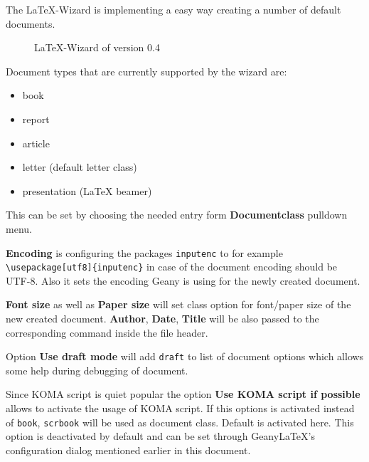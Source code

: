 \documentclass[%
a4paper,%
10pt,%
oneside,%
DIV18,
headsepline,
plainheadsepline,
footsepline,
plainfootsepline,
bibtotoc,%
liststotoc,%
BCOR12mm,%
halfparskip,%
openany,%
]{scrartcl}
\begin{document}
The \LaTeX-Wizard is implementing a easy way creating a number of
default documents.
\begin{figure}[h!]
	\caption{\LaTeX-Wizard of version 0.4}
\end{figure}

Document types that are currently supported by the wizard are:
\begin{itemize}
	\item book
	\item report
	\item article
	\item letter (default letter class)
	\item presentation (\LaTeX{} beamer)
\end{itemize}

This can be set by choosing the needed entry form
\textbf{Documentclass} pulldown menu.

\textbf{Encoding} is configuring the packages \texttt{inputenc} to
for example \texttt{\textbackslash usepackage[utf8]\{inputenc\}} in
case of the document encoding should be UTF-8. Also it sets the
encoding Geany is using for the newly created document.

\textbf{Font size} as well as \textbf{Paper size} will set class option
for font/paper size of the new created document. \textbf{Author},
\textbf{Date}, \textbf{Title} will be also passed to the corresponding
command inside the file header.

Option \textbf{Use draft mode} will add \texttt{draft} to list of
document options which allows some help during debugging of document.

Since KOMA script is quiet popular the option \textbf{Use KOMA script
if possible} allows to activate the usage of KOMA script. If this
options is activated instead of \texttt{book}, \texttt{scrbook} will
be used as document class. Default is activated here. This option is
deactivated by default and can be set through Geany\LaTeX{}'s
configuration dialog mentioned earlier in this document.
\end{document}
